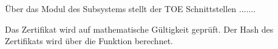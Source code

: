 





Über das Modul  des Subsystems
 stellt der TOE
Schnittstellen .......




Das Zertifikat wird auf mathematische Gültigkeit geprüft. Der Hash des
Zertifikats wird über die Funktion
 berechnet.



